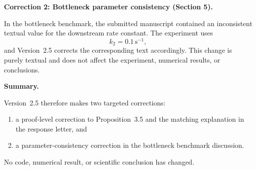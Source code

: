 \documentclass[11pt]{article}
\begin{document}
\medskip

\noindent\textbf{Correction 2: Bottleneck parameter consistency (Section 5).}

In the bottleneck benchmark, the submitted manuscript contained an inconsistent textual value for the downstream rate constant. The experiment uses
\[
k_2 = 0.1\,\mathrm{s}^{-1},
\]
and Version~2.5 corrects the corresponding text accordingly. This change is purely textual and does not affect the experiment, numerical results, or conclusions.

\medskip

\noindent\textbf{Summary.}

Version~2.5 therefore makes two targeted corrections:
\begin{enumerate}
\item a proof-level correction to Proposition~3.5 and the matching explanation in the response letter, and
\item a parameter-consistency correction in the bottleneck benchmark discussion.
\end{enumerate}
No code, numerical result, or scientific conclusion has changed.
\end{document}
